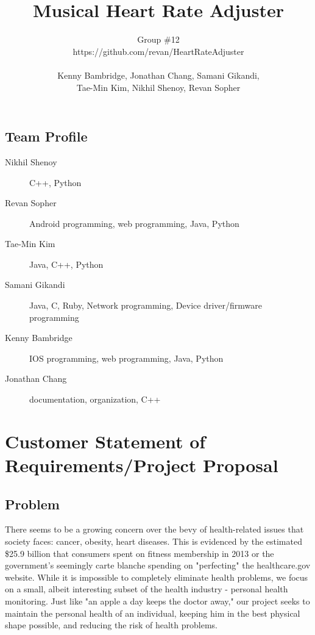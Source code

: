 \documentclass[letterpaper,english, 12pt]{scrreprt}
\title{Musical Heart Rate Adjuster}
\author{Group \#12 \\ https://github.com/revan/HeartRateAdjuster \\ 
\\Kenny Bambridge, Jonathan Chang, Samani Gikandi,
\\Tae-Min Kim, Nikhil Shenoy, Revan Sopher}
\begin{document}
\maketitle

\tableofcontents

\section*{Team Profile}
\begin{description}
	\item[Nikhil Shenoy] C++, Python
	\item[Revan Sopher] Android programming, web programming, Java, Python
	\item[Tae-Min Kim] Java, C++, Python
	\item[Samani Gikandi] Java, C, Ruby, Network programming, Device driver/firmware programming
	\item[Kenny Bambridge] IOS programming, web programming, Java, Python
	\item[Jonathan Chang] documentation, organization, C++
\end{description}
 
\chapter{Customer Statement of Requirements/Project Proposal}
 
\section{Problem}
There seems to be a growing concern over the bevy of health-related issues that society faces: cancer, obesity, heart diseases. This is evidenced by the estimated \$25.9 billion that consumers spent on fitness membership in 2013 or the government's seemingly carte blanche spending on "perfecting" the healthcare.gov website. While it is impossible to completely eliminate health problems, we focus on a small, albeit interesting subset of the health industry - personal health monitoring. Just like "an apple a day keeps the doctor away," our project seeks to maintain the personal health of an individual, keeping him in the best physical shape possible, and reducing the risk of health problems. \\
 
\end{document}
